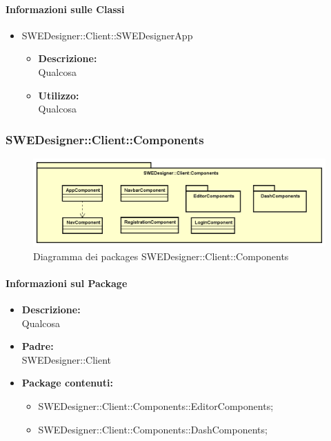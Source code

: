 		\paragraph{Informazioni sulle Classi}
		\begin{itemize}
			\item SWEDesigner::Client::SWEDesignerApp
			\begin{itemize}
				\item \textbf{Descrizione: }\\
				Qualcosa
				\item \textbf{Utilizzo: }\\
				Qualcosa
			\end{itemize}
		\end{itemize}	
		
		
		\subsubsection{SWEDesigner::Client::Components}
		 \begin{figure}[h!]
		\centering
		\includegraphics[scale=0.4]{Disegnetti/SWEDesigner__Client_Components.png}
		\caption{Diagramma dei packages SWEDesigner::Client::Components}
 		\end{figure}
		\paragraph{Informazioni sul Package}
		\begin{itemize}				
			\item \textbf{Descrizione: }\\
			Qualcosa
			\item \textbf{Padre: }\\ SWEDesigner::Client
			\item \textbf{Package contenuti: }
			\begin{itemize}		
				\item SWEDesigner::Client::Components::EditorComponents;
				\item SWEDesigner::Client::Components::DashComponents;
			\end{itemize}
		\end{itemize}
		

